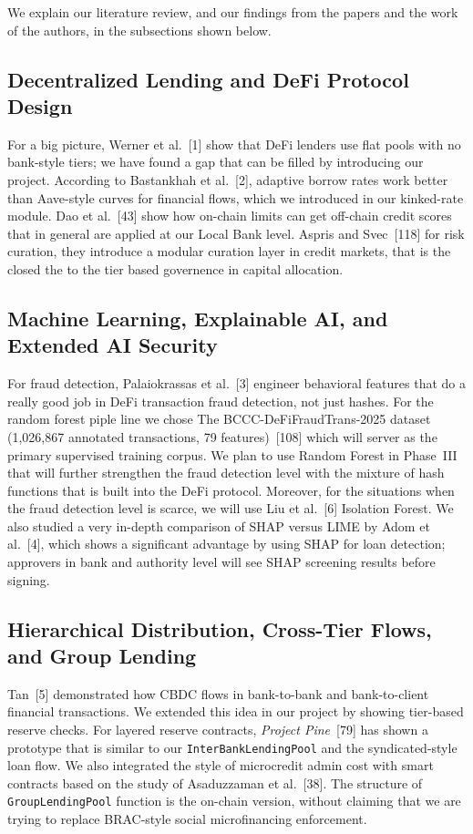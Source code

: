 \documentclass[12pt, a4paper]{report}
\begin{document}
We explain our literature review, and our findings from the papers and the work of the authors, in the subsections shown below.

\subsection{Decentralized Lending and DeFi Protocol Design}

For a big picture, Werner et al.~[1] show that DeFi lenders use flat pools with no bank-style tiers; we have found a gap that can be filled by introducing our project. According to Bastankhah et al.~[2], adaptive borrow rates work better than Aave-style curves for financial flows, which we introduced in our kinked-rate module. Dao et al.~[43] show how on-chain limits can get off-chain credit scores that in general are applied at our Local Bank level. Aspris and Svec~[118] for risk curation, they introduce a modular curation layer in credit markets, that is the closed the to the tier based governence in capital allocation.

\subsection{Machine Learning, Explainable AI, and Extended AI Security}

For fraud detection, Palaiokrassas et al.~[3] engineer behavioral features that do a really good job in DeFi transaction fraud detection, not just hashes. For the random forest piple line we chose The BCCC-DeFiFraudTrans-2025 dataset (1,026,867 annotated transactions, 79 features)~[108] which will server as the primary supervised training corpus. We plan to use Random Forest in Phase~III that will further strengthen the fraud detection level with the mixture of hash functions that is built into the DeFi protocol. Moreover, for the situations when the fraud detection level is scarce, we will use Liu et al.~[6] Isolation Forest. We also studied a very in-depth comparison of SHAP versus LIME by Adom et al.~[4], which shows a significant advantage by using SHAP for loan detection; approvers in bank and authority level will see SHAP screening results before signing.

\subsection{Hierarchical Distribution, Cross-Tier Flows, and Group Lending}
\label{sec:lit-cross-tier}

Tan~[5] demonstrated how CBDC flows in bank-to-bank and bank-to-client financial transactions. We extended this idea in our project by showing tier-based reserve checks. For layered reserve contracts, \textit{Project Pine}~[79] has shown a prototype that is similar to our \texttt{InterBankLendingPool} and the syndicated-style loan flow. We also integrated the style of microcredit admin cost with smart contracts based on the study of Asaduzzaman et al.~[38]. The structure of \texttt{GroupLendingPool} function is the on-chain version, without claiming that we are trying to replace BRAC-style social microfinancing enforcement.
\end{document}
